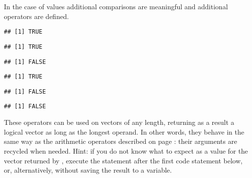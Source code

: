 \documentclass[krantz2]{krantz}\usepackage{knitr}
\begin{document}
In the case of  values additional comparisons are meaningful and additional operators are defined.
\begin{knitrout}\footnotesize
{}\color{fgcolor}\begin{kframe}
\begin{alltt}
 \hlopt{>} 
\end{alltt}
\begin{verbatim}
## [1] TRUE
\end{verbatim}
\begin{alltt}
 \hlopt{>=} 
\end{alltt}
\begin{verbatim}
## [1] TRUE
\end{verbatim}
\begin{alltt}
 \hlopt{==} 
\end{alltt}
\begin{verbatim}
## [1] FALSE
\end{verbatim}
\begin{alltt}
 \hlopt{!=} 
\end{alltt}
\begin{verbatim}
## [1] TRUE
\end{verbatim}
\begin{alltt}
 \hlopt{<=} 
\end{alltt}
\begin{verbatim}
## [1] FALSE
\end{verbatim}
\begin{alltt}
 \hlopt{<} 
\end{alltt}
\begin{verbatim}
## [1] FALSE
\end{verbatim}
\begin{alltt}
 \hlkwb{<-} 
\end{alltt}
\end{kframe}
\end{knitrout}

These operators can be used on vectors of any length, returning as a result a logical vector as long as the longest operand. In other words, they behave in the same way as the arithmetic operators described on page \pageref{par:vectorized:numeric}: their arguments are recycled when needed. Hint: if you do not know what to expect as a value for the vector returned by , execute the statement  after the first code statement below, or, alternatively,  without saving the result to a variable.
\end{document}
